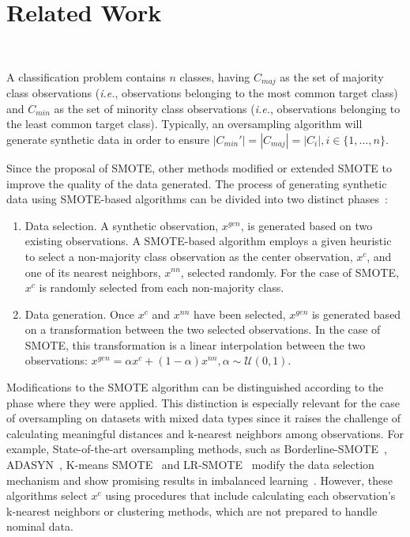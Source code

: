 \section{Related Work}~\label{sec:related_work-gsmotenc}

A classification problem contains $n$ classes, having $C_{maj}$ as the set of
majority class observations (\textit{i.e.}, observations belonging to the most
common target class) and $C_{min}$ as the set of minority class observations
(\textit{i.e.}, observations belonging to the least common target class).
Typically, an oversampling algorithm will generate synthetic data in order to
ensure $|C_{min}'|=|C_{maj}|=|C_i|, i \in \{1, \ldots, n\}$.

Since the proposal of SMOTE, other methods modified or extended SMOTE to
improve the quality of the data generated. The process of generating synthetic
data using SMOTE-based algorithms can be divided into two distinct
phases~\cite{fernandez2018smote}:

\begin{enumerate}
    \item Data selection. A synthetic observation, $x^{gen}$, is generated
        based on two existing observations. A SMOTE-based algorithm employs a
        given heuristic to select a non-majority class observation as the
        center observation, $x^c$, and one of its nearest neighbors, $x^{nn}$,
        selected randomly. For the case of SMOTE, $x^c$ is randomly selected
        from each non-majority class.
    \item Data generation. Once $x^c$ and $x^{nn}$ have been selected, $x^{gen}$
        is generated based on a transformation between the two selected
        observations. In the case of SMOTE, this transformation is 
        a linear interpolation between the two observations: $x^{gen} = \alpha x^c
        + (1-\alpha) x^{nn}, \alpha \sim \mathcal{U}(0, 1)$.
\end{enumerate}

Modifications to the SMOTE algorithm can be distinguished according to the
phase where they were applied. This distinction is especially relevant for the
case of oversampling on datasets with mixed data types since it raises the
challenge of calculating meaningful distances and k-nearest neighbors among
observations. For example, State-of-the-art oversampling methods, such as
Borderline-SMOTE~\cite{Han2005}, ADASYN~\cite{HaiboHe2008}, K-means
SMOTE~\cite{Douzas2018} and LR-SMOTE~\cite{liang2020lr} modify the
data selection mechanism and show promising results in imbalanced
learning~\cite{Fonseca2021}. However, these algorithms select $x^c$
using procedures that include calculating each observation's k-nearest
neighbors or clustering methods, which are not prepared to handle nominal
data.

